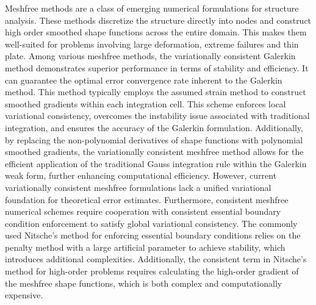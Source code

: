 \begin{abstractEn}
Meshfree methods are a class of emerging numerical formulations for structure analysis. 
These methods discretize the structure directly into nodes and construct high order smoothed shape functions across the entire domain. This makes them well-suited for problems involving large deformation, extreme failures and thin plate.
Among various meshfree methods, the variationally consistent Galerkin method demonstrates superior performance in terms of stability and efficiency. It can guarantee the optimal error convergence rate inherent to the Galerkin method. 
This method typically employs the assumed strain method to construct smoothed gradients within each integration cell. This scheme enforces local variational consistency, overcomes the instability issue associated with traditional integration, and ensures the accuracy of the Galerkin formulation. 
Additionally, by replacing the non-polynomial derivatives of shape functions with polynomial smoothed gradients, the variationally consistent meshfree method allows for the efficient application of the traditional Gauss integration rule within the Galerkin weak form, further enhancing computational efficiency.
However, current variationally consistent meshfree formulations lack a unified variational foundation for theoretical error estimates. 
Furthermore, consistent meshfree numerical schemes require cooperation with consistent essential boundary condition enforcement to satisfy global variational consistency. The commonly used Nitsche's method for enforcing essential boundary conditions relies on the penalty method with a large artificial parameter to achieve stability, which introduces additional complexities. Additionally, the consistent term in Nitsche's method for high-order problems requires calculating the high-order gradient of the meshfree shape functions, which is both complex and computationally expensive.


\end{abstractEn}
